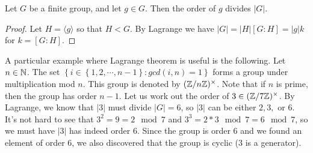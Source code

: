 \begin{corollary}
  Let $G$ be a finite group, and let $g\in G$. Then the order of $g$ divides $|G|$.
  \label{lagrangeConsequence}
\end{corollary}
\begin{proof}
  Let $H=\langle g \rangle$ so that $H<G$. By Lagrange we have $|G|=|H|[G:H]=|g|k$ for $k=[G:H]$.
\end{proof}

\begin{example}
  A particular example where Lagrange theorem is useful is the following. Let
  $n\in\mathbb N$. The set $\left\{ i\in \left\{ 1,2,\cdots,n-1 \right\} : gcd(i,n)=1 \right\}$
  forms a group under multiplication mod $n$. This group is denoted by
  $(\mathbb Z/n\mathbb Z)^{\times}$. Note that if $n$ is prime, then the group has order $n-1$. Let us
  work out the order of $3\in (\mathbb Z/7\mathbb Z)^{\times}$. By Lagrange, we know that $|3|$ must
  divide $|G|=6$, so $|3|$ can be either $2,3,$ or $6$. It's not hard to see that
  $3^2=9=2\mod 7$ and $3^3=2*3\mod 7=6\mod 7$, so we must have $|3|$ has indeed order $6$. Since the group
  is order $6$ and we found an element of order $6$, we also discovered that the group is
  cyclic ($3$ is a generator).
\end{example}
